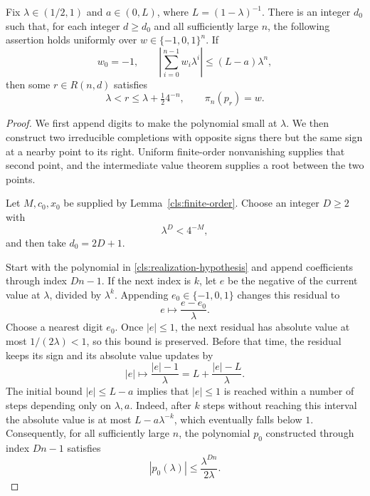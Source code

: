 \begin{proposition}
\label{cls:realization}
Fix $\lambda\in(1/2,1)$ and $a\in(0,L)$, where $L=(1-\lambda)^{-1}$.
There is an integer $d_0$ such that, for each integer $d\geq d_0$ and
all sufficiently large $n$, the following assertion holds uniformly
over $w\in\{-1,0,1\}^n$.  If
\begin{equation}
  w_0=-1,
  \qquad
  \left|\sum_{i=0}^{n-1}w_i\lambda^i\right|
      \leq(L-a)\lambda^n,
  \label{cls:realization-hypothesis}
\end{equation}
then some $r\in R(n,d)$ satisfies
\[
  \lambda<r\leq\lambda+\tfrac12 4^{-n},
  \qquad \pi_n(p_r)=w.
\]
\end{proposition}

\begin{proof}
We first append digits to make the polynomial small at $\lambda$.
We then construct two irreducible completions with opposite signs there
but the same sign at a nearby point to its right.  Uniform finite-order
nonvanishing supplies that second point, and the intermediate value
theorem supplies a root between the two points.

Let $M,c_0,x_0$ be supplied by Lemma~\ref{cls:finite-order}.  Choose
an integer $D\geq2$ with
\begin{equation}
  \lambda^D<4^{-M},
  \label{cls:D-choice}
\end{equation}
and then take $d_0=2D+1$.

Start with the polynomial in \eqref{cls:realization-hypothesis} and
append coefficients through index $Dn-1$.  If the next index is $k$,
let $e$ be the negative of the current value at $\lambda$, divided by
$\lambda^k$.  Appending $e_0\in\{-1,0,1\}$ changes this residual to
\[
  e\longmapsto\frac{e-e_0}{\lambda}.
\]
Choose a nearest digit $e_0$.  Once $|e|\leq1$, the next residual has
absolute value at most $1/(2\lambda)<1$, so this bound is preserved.
Before that time, the residual keeps its sign and its absolute value
updates by
\[
  |e|\longmapsto\frac{|e|-1}{\lambda}
        =L+\frac{|e|-L}{\lambda}.
\]
The initial bound $|e|\leq L-a$ implies that $|e|\leq1$ is reached
within a number of steps depending only on $\lambda,a$.  Indeed,
after $k$ steps without reaching this interval the absolute value is
at most $L-a\lambda^{-k}$, which eventually falls below $1$.
Consequently, for all sufficiently large $n$, the polynomial $p_0$
constructed through index $Dn-1$ satisfies
\begin{equation}
  |p_0(\lambda)|\leq\frac{\lambda^{Dn}}{2\lambda}.
  \label{cls:residual}
\end{equation}


\end{proof}
